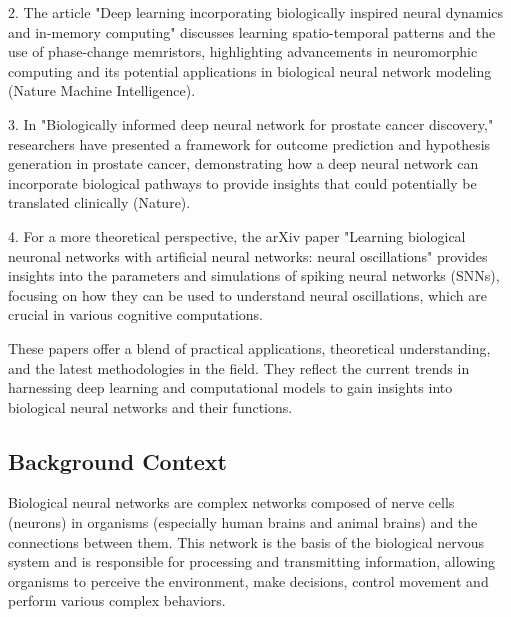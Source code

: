 \documentclass[paper=a4, fontsize=11pt]{scrartcl} %
\numberwithin{equation}{section} %
\numberwithin{figure}{section} %
\numberwithin{table}{section} %
\begin{document}
2. The article "Deep learning incorporating biologically inspired neural dynamics and in-memory computing" discusses learning spatio-temporal patterns and the use of phase-change memristors, highlighting advancements in neuromorphic computing and its potential applications in biological neural network modeling (Nature Machine Intelligence).

3. In "Biologically informed deep neural network for prostate cancer discovery," researchers have presented a framework for outcome prediction and hypothesis generation in prostate cancer, demonstrating how a deep neural network can incorporate biological pathways to provide insights that could potentially be translated clinically (Nature).

4. For a more theoretical perspective, the arXiv paper "Learning biological neuronal networks with artificial neural networks: neural oscillations" provides insights into the parameters and simulations of spiking neural networks (SNNs), focusing on how they can be used to understand neural oscillations, which are crucial in various cognitive computations.

These papers offer a blend of practical applications, theoretical understanding, and the latest methodologies in the field. They reflect the current trends in harnessing deep learning and computational models to gain insights into biological neural networks and their functions.



















\subsection{Background Context}
Biological neural networks are complex networks composed of nerve cells (neurons) in organisms (especially human brains and animal brains) and the connections between them. This network is the basis of the biological nervous system and is responsible for processing and transmitting information, allowing organisms to perceive the environment, make decisions, control movement and perform various complex behaviors.
\end{document}
